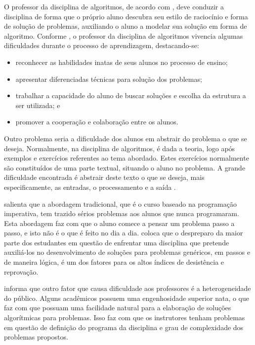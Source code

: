 O professor da disciplina de algoritmos, de acordo com , deve
conduzir a disciplina de forma que o próprio aluno descubra seu estilo de
raciocínio e forma de solução de problemas, auxiliando o aluno a modelar sua
solução em forma de algoritmo. Conforme , o
professor da disciplina de algoritmos vivencia algumas dificuldades durante o
processo de aprendizagem, destacando-se:

\begin{itemize}
  \setlength\itemsep{0em}
  \item reconhecer as habilidades inatas de seus alunos no processo de ensino;
  \item apresentar diferenciadas técnicas para solução dos problemas;
  \item trabalhar a capacidade do aluno de buscar soluções e escolha da
estrutura a ser utilizada; e
  \item promover a cooperação e colaboração entre os alunos.
\end{itemize}

Outro problema seria a dificuldade dos alunos em abstrair do problema o que se
deseja. Normalmente, na disciplina de algoritmos, é dada a teoria, logo após
exemplos e exercícios referentes ao tema abordado. Estes exercícios normalmente
são constituídos de uma parte textual, situando o aluno no problema. A grande
dificuldade encontrada é abstrair deste texto o que se deseja, mais
especificamente, as entradas, o processamento e a saída \cite{miranda2004}.

 salienta que a abordagem tradicional, que é o
curso baseado na programação imperativa, tem trazido sérios problemas aos alunos
que nunca programaram. Esta abordagem faz com que o aluno comece a pensar um
problema passo a passo, e isto não é o que é feito no dia a dia.
 coloca que o despreparo da maior parte dos
estudantes em questão de enfrentar uma disciplina que pretende auxiliá-los no
desenvolvimento de soluções para problemas genéricos, em passos e de maneira
lógica, é um dos fatores para os altos índices de desistência e reprovação.

 informa que outro fator que causa dificuldade aos
professores é a heterogeneidade do público. Alguns acadêmicos possuem uma
engenhosidade superior nata, o que faz com que possuam uma facilidade natural
para a elaboração de soluções algorítmicas para problemas. Isso faz com que os
instrutores tenham problemas em questão de definição do programa da disciplina
e grau de complexidade dos problemas propostos.

